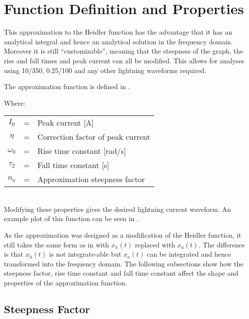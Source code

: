 \section{Function Definition and Properties}
\label{sec:approx_function_definition_and_properties}

This approximation to the Heidler function has the advantage that it has an analytical integral and hence an analytical solution in the frequency domain. Moreover it is still ``customizable'', meaning that the steepness of the graph, the rise and fall times and peak current can all be modified. This allows for analyses using 10/350, 0.25/100 and any other lightning waveforms required.

The approximation function is defined in .

Where: \\
\begin{tabular}{cll}
    $I_0$ & = & Peak current [A] \\
    $\eta$ & = & Correction factor of peak current \\
    $\omega_0$ & = & Rise time constant [rad/s] \\
    $\tau_2$ & = & Fall time constant [s] \\
    $n_a$ & = & Approximation steepness factor
\end{tabular}\\

Modifying these properties gives the desired lightning current waveform. An example plot of this function can be seen in .

As the approximation was designed as a modification of the Heidler function, it still takes the same form as in  with $x_h \left( t \right)$ replaced with $x_a \left( t \right)$. The difference is that $x_h \left( t \right)$ is not integrate-able but $x_a \left( t \right)$ can be integrated and hence transformed into the frequency domain. The following subsections show how the steepness factor, rise time constant and fall time constant affect the shape and properties of the approximation function.

\subsection{Steepness Factor}
\label{sub:approx_steepness_factor}

